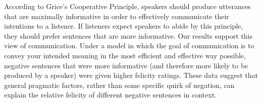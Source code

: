 \documentclass[man, noapacite]{apa2}
\begin{document}
According to Grice's Cooperative Principle, speakers should produce utterances that are maximally informative in order to effectively communicate their intentions to a listener.  If listeners expect speakers to abide by this principle, they should prefer sentences that are more informative.  Our results support this view of communication.  Under a model in which the goal of communication is to convey your intended meaning in the most efficient and effective way possible, negative sentences that were more informative (and therefore more likely to be produced by a speaker) were given higher felicity ratings.  These data suggest that general pragmatic factors, rather than some specific quirk of negation, can explain the relative felicity of different negative sentences in context.  


 
 



\setlength{\bibleftmargin}{.125in}
\setlength{\bibindent}{-\bibleftmargin}


\end{document}
